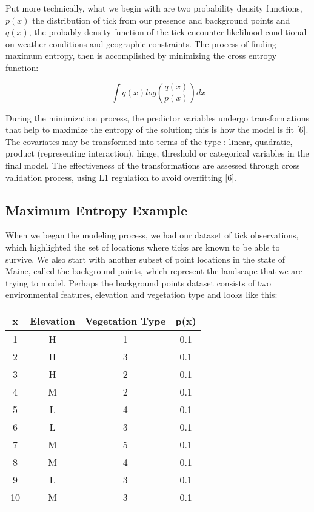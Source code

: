 \noindent Put more technically, what we begin with are two probability density functions, $p(x)$ the distribution of tick from our presence and background points and $q(x)$, the probably density function of the tick encounter likelihood conditional on weather conditions and geographic constraints. The process of finding maximum entropy, then is  accomplished by minimizing the cross entropy function:  \newline

\begin{equation}
\int q(x)log(\frac{q(x)}{p(x)}) dx
\end{equation}


\noindent  During the minimization process, the predictor variables undergo transformations that help to maximize the entropy of the solution; this is how the model is fit [6]. The covariates may be transformed into terms of the type : linear, quadratic, product (representing interaction), hinge, threshold or categorical variables in the final model. The effectiveness of the transformations are assessed through cross validation process, using L1 regulation to avoid overfitting [6].  \newline


\subsection{Maximum Entropy Example}

\noindent When we began the modeling process, we had our dataset of tick observations, which highlighted the set of locations where ticks are known to be able to survive. We also start with another subset of point locations in the state of Maine, called the background points, which represent the landscape that we are trying to model. Perhaps the background points dataset consists of two environmental features, elevation and vegetation type and looks like this: 

\begin{center}
 \begin{tabular}{||c c c c||} 
 \hline
 x & Elevation & Vegetation Type & p(x) \\ [0.5ex] 
 \hline\hline
 1 & H &  1& 0.1  \\ 
 \hline
  2 & H & 3 & 0.1\\
 \hline
   3 & H & 2 & 0.1\\
 \hline
 4 & M & 2 & 0.1  \\
 \hline
  5 & L & 4 & 0.1 \\
 \hline
   6 & L & 3 & 0.1\\
 \hline
  7 & M & 5 & 0.1 \\
 \hline
   8 & M & 4 & 0.1\\
 \hline
 9 & L & 3 & 0.1 \\
 \hline
   10 & M & 3 & 0.1\\
 \hline
\end{tabular}
\end{center}


